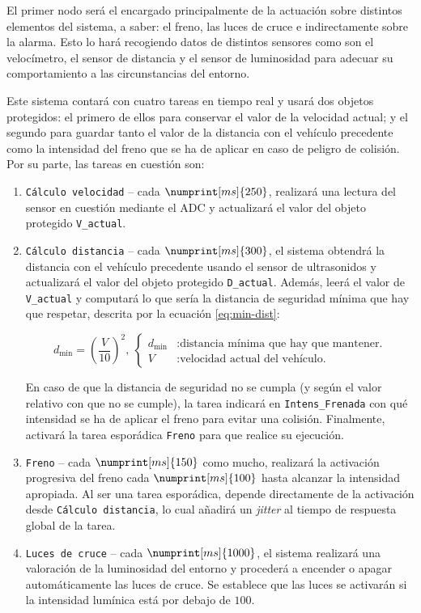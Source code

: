 El primer nodo será el encargado principalmente de la actuación sobre distintos
elementos del sistema, a saber: el freno, las luces de cruce e indirectamente sobre
la alarma. Esto lo hará recogiendo datos de distintos sensores como son el velocímetro,
el sensor de distancia y el sensor de luminosidad para adecuar su comportamiento a las
circunstancias del entorno.

Este sistema contará con cuatro tareas en tiempo real y usará dos objetos protegidos:
el primero de ellos para conservar el valor de la velocidad actual; y el segundo para
guardar tanto el valor de la distancia con el vehículo precedente como la intensidad
del freno que se ha de aplicar en caso de peligro de colisión. Por su parte, las
tareas en cuestión son:

\begin{enumerate}
  \item \texttt{Cálculo velocidad} -- cada $\numprint[ms]{250}$, realizará una lectura
        del sensor en cuestión mediante el ADC y actualizará el valor del objeto 
        protegido \texttt{V\_actual}.
  \item \texttt{Cálculo distancia} -- cada $\numprint[ms]{300}$, el sistema obtendrá la
        distancia con el vehículo precedente usando el sensor de ultrasonidos y
        actualizará el valor del objeto protegido \texttt{D\_actual}. Además, leerá el
        valor de \texttt{V\_actual} y computará lo que sería la distancia de seguridad
        mínima que hay que respetar, descrita por la ecuación \ref{eq:min-dist}:

        \begin{equation}\label{eq:min-dist}
          d_{\min} = \left(\frac{V}{10}\right)^2,~\begin{cases}
            d_{\min} &: \text{distancia mínima que hay que mantener.} \\
            V &: \text{velocidad actual del vehículo.}
          \end{cases}
        \end{equation}

        En caso de que la distancia de seguridad no se cumpla (y según el valor relativo
        con que no se cumple), la tarea indicará en \texttt{Intens\_Frenada} con qué
        intensidad se ha de aplicar el freno para evitar una colisión. Finalmente,
        activará la tarea esporádica \texttt{Freno} para que realice su ejecución.
  \item \texttt{Freno} -- cada $\numprint[ms]{150}$ como mucho, realizará la activación
        progresiva del freno cada $\numprint[ms]{100}$ hasta alcanzar la intensidad
        apropiada. Al ser una tarea esporádica, depende directamente de la activación
        desde \texttt{Cálculo distancia}, lo cual añadirá un \textit{jitter} al tiempo
        de respuesta global de la tarea.
  \item \texttt{Luces de cruce} -- cada $\numprint[ms]{1000}$, el sistema realizará una
        valoración de la luminosidad del entorno y procederá a encender o apagar automáticamente
        las luces de cruce. Se establece que las luces se activarán si la intensidad lumínica
        está por debajo de $100$.
\end{enumerate}

